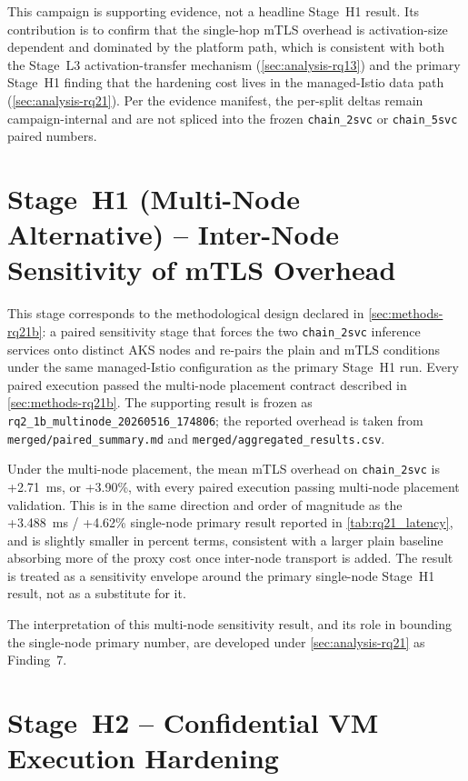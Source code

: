This campaign is supporting evidence, not a headline Stage~H1 result. Its
contribution is to confirm that the single-hop mTLS overhead is activation-size
dependent and dominated by the platform path, which is consistent with both the
Stage~L3 activation-transfer mechanism (\cref{sec:analysis-rq13}) and the primary
Stage~H1 finding that the hardening cost lives in the managed-Istio data path
(\cref{sec:analysis-rq21}). Per the evidence manifest, the per-split deltas remain
campaign-internal and are not spliced into the frozen \texttt{chain\_2svc} or
\texttt{chain\_5svc} paired numbers.

\section{Stage~H1 (Multi-Node Alternative) -- Inter-Node Sensitivity of mTLS Overhead}
\label{sec:rq21b}

This stage corresponds to the methodological design declared in
\cref{sec:methods-rq21b}: a paired sensitivity stage that forces the two
\texttt{chain\_2svc} inference services onto distinct AKS nodes and re-pairs
the plain and mTLS conditions under the same managed-Istio configuration as
the primary Stage~H1 run. Every paired execution passed the multi-node placement
contract described in \cref{sec:methods-rq21b}. The supporting result is
frozen as \texttt{rq2\_1b\_multinode\_20260516\_174806}; the reported
overhead is taken from \texttt{merged/paired\_summary.md} and
\texttt{merged/aggregated\_results.csv}.

Under the multi-node placement, the mean mTLS overhead on \texttt{chain\_2svc}
is +2.71~ms, or +3.90\%, with every paired execution passing multi-node
placement validation. This is in the same direction and order of magnitude as
the +3.488~ms / +4.62\% single-node primary result reported in
\cref{tab:rq21_latency}, and is slightly smaller in percent terms, consistent
with a larger plain baseline absorbing more of the proxy cost once inter-node
transport is added. The result is treated as a sensitivity envelope around the
primary single-node Stage~H1 result, not as a substitute for it.

The interpretation of this multi-node sensitivity result, and its role in
bounding the single-node primary number, are developed under
\cref{sec:analysis-rq21} as Finding~7.

\section{Stage~H2 -- Confidential VM Execution Hardening}
\label{sec:rq22}

